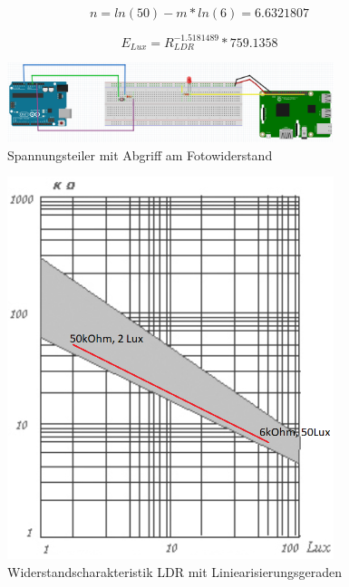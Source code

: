 \begin{equation}
n = ln(50) - m*ln(6) = 6.6321807
\label{equ:line_n}
\end{equation}

\begin{equation}
E_{Lux} = R_{LDR}^{-1.5181489}*759.1358
\label{equ:luxgleichung}
\end{equation}

\begin{figure}
	\centering
	\includegraphics[width=0.85\textwidth]{figures/Schaltplaene/adwandler.png}
	\caption{Spannungsteiler mit Abgriff am Fotowiderstand}
	\label{img:adwandler}
\end{figure}

\begin{figure}
	\centering
	\includegraphics[width=0.85\textwidth]{figures/ldr_kennlinie.png}
	\caption{Widerstandscharakteristik LDR mit Liniearisierungsgeraden}
	\label{img:ldr_kennlinie}
\end{figure}


